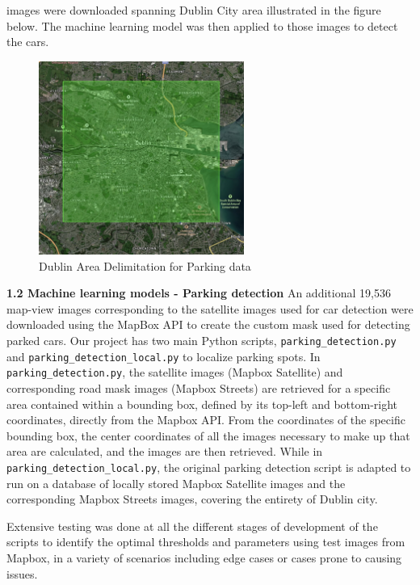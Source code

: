 images were downloaded spanning Dublin City area illustrated in the figure
below. The machine learning model was then applied to those images to detect the
cars.
\begin{figure}[htbp]
    \centering
    \includegraphics[width=0.6\textwidth]{images/dublin-img-area.jpg}
    \caption{Dublin Area Delimitation for Parking data}
\end{figure}

\textbf{1.2 Machine learning models - Parking detection}
An additional 19,536 map-view images corresponding to the satellite images used
for car detection were downloaded using the MapBox API to create the custom mask
used for detecting parked cars. Our project has two main Python scripts,
\texttt{parking\_detection.py} and \texttt{parking\_detection\_local.py} to
localize parking spots. In \texttt{parking\_detection.py}, the satellite images
(Mapbox Satellite) and corresponding road mask images (Mapbox Streets) are
retrieved for a specific area contained within a bounding box, defined by its
top-left and bottom-right coordinates, directly from the Mapbox API. From the
coordinates of the specific bounding box, the center coordinates of all the
images necessary to make up that area are calculated, and the images are then
retrieved. While in \texttt{parking\_detection\_local.py}, the original parking
detection script is adapted to run on a database of locally stored Mapbox
Satellite images and the corresponding Mapbox Streets images, covering the
entirety of Dublin city. 

Extensive testing was done at all the different stages of development of the
scripts to identify the optimal thresholds and parameters using test images from
Mapbox, in a variety of scenarios including edge cases or cases prone to causing
issues.

\newpage{}

